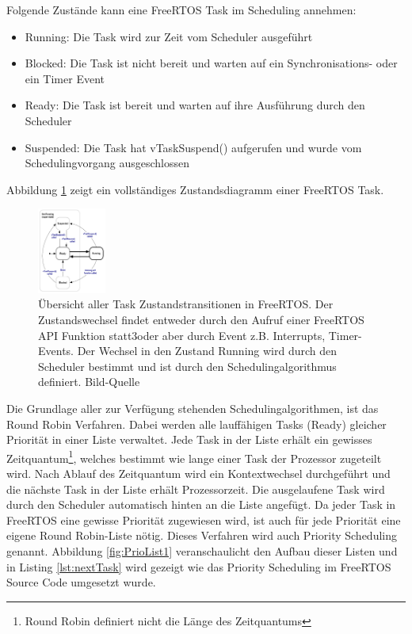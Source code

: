 \newline
{}   
Folgende Zu\-stän\-de kann eine FreeRTOS Task im Scheduling annehmen: 
\begin{itemize}
	\item Running: Die Task wird zur Zeit vom Scheduler ausgeführt
	\item Blocked: Die Task ist nicht bereit und warten auf ein Synchronisations- oder ein Timer Event
	\item Ready: Die Task ist bereit und warten auf ihre Aus\-füh\-rung durch den Scheduler
	\item Suspended: Die Task hat vTaskSuspend() aufgerufen und wurde vom Schedulingvorgang ausgeschlossen
\end{itemize}
 Abbildung \ref{fig:TaskStates} zeigt ein vollständiges Zustandsdiagramm einer FreeRTOS Task.
\begin{figure}[ht!]
	\centering
		\includegraphics[width=0.2\textwidth]{Pictures/FreeRTOSOrg/taskStates.png}
	\caption{Übersicht aller Task Zustandstransitionen in FreeRTOS. Der Zustandswechsel findet entweder durch den Aufruf einer FreeRTOS API Funktion statt3oder aber durch Event z.B. Interrupts, Timer-Events. Der Wechsel in den Zustand Running wird durch den Scheduler bestimmt und ist durch den Schedulingalgorithmus definiert.  Bild-Quelle~\protect{}}
	\label{fig:TaskStates}
\end{figure} 
\newline
Die Grundlage aller zur Verfügung stehenden Schedulingalgorithmen, ist das Round Robin Verfahren\cite{9783827373427}. Dabei werden alle lauf\-fäh\-igen Tasks (Ready) gleicher Priorität in einer Liste verwaltet. Jede Task in der Liste erhält ein gewisses Zeitquantum\footnote{Round Robin definiert nicht die Länge des Zeitquantums}, welches bestimmt wie lange einer Task der Prozessor zugeteilt wird. Nach Ablauf des Zeitquantum wird ein Kontextwechsel durchgeführt und die näch\-ste Task in der Liste erhält Prozessorzeit. Die ausgelaufene Task wird durch den Scheduler automatisch hinten an die Liste angefügt. Da jeder Task in FreeRTOS eine gewisse Priorität zugewiesen wird, ist auch für jede Priorität eine eigene Round Robin-Liste nötig. Dieses Verfahren wird auch Priority Scheduling \cite{9783827373427} genannt. Abbildung \ref{fig:PrioList1} veranschaulicht den Aufbau dieser Listen und in Listing \ref{lst:nextTask} wird gezeigt wie das Priority Scheduling im FreeRTOS Source Code umgesetzt wurde. 
